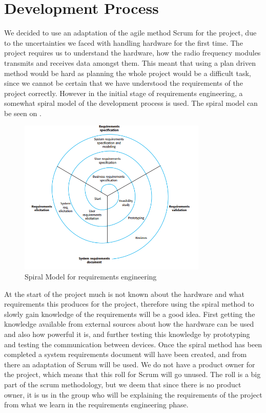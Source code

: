 
\chapter{Development Process}
We decided to use an adaptation of the agile method Scrum for the project, due to the uncertainties we faced with handling hardware for the first time. The project requires us to understand the hardware, how the radio frequency modules transmits and receives data amongst them. This meant that using a plan driven method would be hard as planning the whole project would be a difficult task, since we cannot be certain that we have understood the requirements of the project correctly.
However in the initial stage of requirements engineering, a somewhat spiral model of the development process is used. The spiral model can be seen on .

\begin{figure}[ht]
\centering
\includegraphics[width=0.80\textwidth]{Figures/spiral.png}
\caption{Spiral Model for requirements engineering \citep[p.112]{SOEBOOK}}\label{fig:spiralDiagram}
\end{figure}

At the start of the project much is not known about the hardware and what requirements this produces for the project, therefore using the spiral method to slowly gain knowledge of the requirements will be a good idea. First getting the knowledge available from external sources about how the hardware can be used and also how powerful it is, and further testing this knowledge by prototyping and testing the communication between devices. 
Once the spiral method has been completed a system requirements document will have been created, and from there an adaptation of Scrum will be used.
We do not have a product owner for the project, which means that this roll for Scrum will go unused. The roll is a big part of the scrum methodology, but we deem that since there is no product owner, it is us in the group who will be explaining the requirements of the project from what we learn in the requirements engineering phase. 

